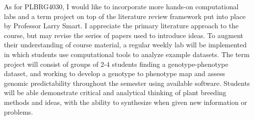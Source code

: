 \documentclass[10pt]{article}
\begin{document}
As for PLBRG4030, I would like to incorporate more hands-on computational labs and a term project on top of the literature review framework put into place by Professor Larry Smart. I appreciate the primary literature approach to the course, but may revise the series of papers used to introduce ideas. To augment their understanding of course material, a regular weekly lab will be implemented in which students use computational tools to analyze example datasets. The term project will consist of groups of 2-4 students finding a genotype-phenotype dataset, and working to develop a genotype to phenotype map and assess genomic predictability throughout the semester using available software. Students will be able demonstrate critical and analytical thinking of plant breeding methods and ideas, with the ability to synthesize when given new information or problems. 





\end{document}
